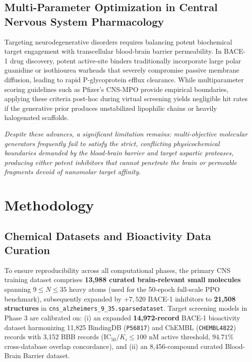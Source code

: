 \documentclass[10pt,a4paper]{article}
\begin{document}
\subsection{Multi-Parameter Optimization in Central Nervous System Pharmacology}
Targeting neurodegenerative disorders requires balancing potent biochemical target engagement with transcellular blood-brain barrier permeability. In BACE-1 drug discovery, potent active-site binders traditionally incorporate large polar guanidine or isothiourea warheads that severely compromise passive membrane diffusion, leading to rapid P-glycoprotein efflux clearance. While multiparameter scoring guidelines such as Pfizer's CNS-MPO provide empirical boundaries, applying these criteria post-hoc during virtual screening yields negligible hit rates if the generative prior produces unstabilized lipophilic chains or heavily halogenated scaffolds.
\par\vspace{0.08cm}
\noindent\textit{Despite these advances, a significant limitation remains: multi-objective molecular generators frequently fail to satisfy the strict, conflicting physicochemical boundaries demanded by the blood-brain barrier and target aspartic proteases, producing either potent inhibitors that cannot penetrate the brain or permeable fragments devoid of nanomolar target affinity.}
\section{Methodology}

\subsection{Chemical Datasets and Bioactivity Data Curation}
To ensure reproducibility across all computational phases, the primary CNS training dataset comprises \textbf{13,988 curated brain-relevant small molecules} spanning $9 \le N \le 35$ heavy atoms (used for the 50-epoch full-scale PPO benchmark), subsequently expanded by $+7,520$ BACE-1 inhibitors to \textbf{21,508 structures} in \texttt{cns\_alzheimers\_9\_35.sparsedataset}. Target screening models in Phase 3 are calibrated on: (i) an expanded \textbf{14,972-record} BACE-1 bioactivity dataset harmonizing 11,825 BindingDB (\texttt{P56817}) and ChEMBL (\texttt{CHEMBL4822}) records with 3,152 BBB records ($\mathrm{IC}_{50}/K_i \le 100\text{ nM}$ active threshold, $94.71\%$ cross-database overlap concordance), and (ii) an 8,456-compound curated Blood-Brain Barrier dataset.
\end{document}
